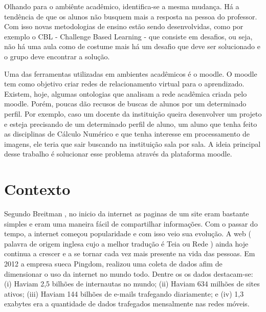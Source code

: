 Olhando para o ambiênte acadêmico, identifica-se a mesma mudança. Há a tendência de que os alunos não busquem mais a resposta na pessoa do professor. Com isso novas metodologias de ensino estão sendo desenvolvidas, como por exemplo o CBL - Challenge Based Learning - que consiste em desafios, ou seja, não há uma aula como de costume mais há um desafio que deve ser solucionado e o grupo deve encontrar a solução\cite{CBL}.

Uma das ferramentas utilizadas em ambientes acadêmicos é o moodle. O moodle tem como objetivo criar redes de relacionamento virtual para o aprendizado. Existem, hoje, algumas ontologias que analisam a rede acadêmica criada pelo moodle. Porém, poucas dão recusos de buscas de alunos por um determinado perfil. Por exemplo, caso um docente da instituição queira desenvolver um projeto e esteja precisando de um determinado perfil de aluno, um aluno que tenha feito as disciplinas de Cálculo Numérico e que tenha interesse em processamento de imagens, ele teria que sair buscando na instituição sala por sala. A ideia principal desse trabalho é solucionar esse problema através da plataforma moodle.


\section{Contexto}

Segundo Breitman \cite{BK}, no inicio da internet as paginas de um site eram bastante simples e eram uma maneira fácil de compartilhar informações. Com o passar do tempo, a internet começou popularidade e com isso veio sua evolução. A web ( palavra de origem inglesa cujo a melhor tradução é Teia ou Rede ) ainda hoje continua a crescer e a se tornar cada vez mais presente na vida das pessoas.  Em 2012 a empresa sueca Pingdom, realizou uma coleta de dados afim de dimensionar o uso da internet no mundo todo. Dentre os os dados destacam-se: (i) Haviam 2,5 bilhões de internautas no mundo; (ii) Haviam 634 milhões de sites ativos; (iii) Haviam 144 bilhões de e-mails trafegando diariamente;  e (iv) 1,3 exabytes era a quantidade de dados trafegados mensalmente nas redes móveis.   


